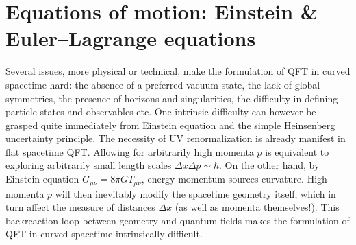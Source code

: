 \documentclass[../geometry_main.tex]{subfiles}
\begin{document}
\section{Equations of motion: Einstein \& Euler--Lagrange equations}


\begin{mytheorem}
Several issues, more physical or technical, make the formulation of QFT in curved spacetime hard: the absence of a preferred vacuum state, the lack of global symmetries, the presence of horizons and singularities, the difficulty in defining particle states and observables etc.
One intrinsic difficulty can however be grasped quite immediately from Einstein equation and the simple Heinsenberg uncertainty principle.
The necessity of UV renormalization is already manifest in flat spacetime QFT.
Allowing for arbitrarily high momenta $p$ is equivalent to exploring arbitrarily small length scales $\Delta x \Delta p \sim \hbar$.
On the other hand, by Einstein equation $G_{\mu\nu} = 8\pi G T_{\mu\nu}$, energy-momentum sources curvature.
High momenta $p$ will then inevitably modify the spacetime geometry itself, which in turn affect the measure of distances $\Delta x$ (as well as momenta themselves!).
This backreaction loop between geometry and quantum fields makes the formulation of QFT in curved spacetime intrinsically difficult.
\end{mytheorem}
\end{document}
